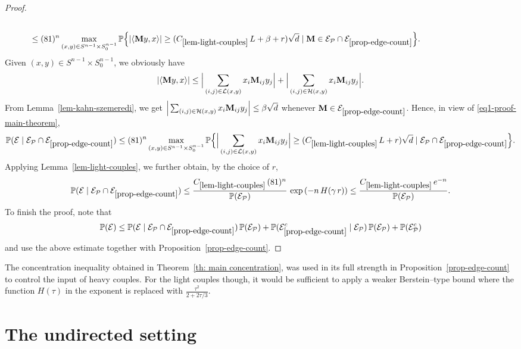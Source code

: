 \documentclass[12pt]{article}
\theoremstyle{definition}
\theoremstyle{plain}
\newcommand{\Event}{\mathcal{E}}
\def\ranmtx{{\bf{}M}}
\def\Prob{{\mathbb P}}
\def\pvector{{\mathcal P}}
\begin{document}
\begin{proof}
\begin{align}
&\nonumber\\
&\hspace{-3cm}\leq (81)^n\max_{(x,y)\in S^{n-1}\times S_0^{n-1}}
\Prob\Big\{ \vert\langle \ranmtx y,x\rangle\vert\geq (C_{\ref{lem-light-couples}}\, L+ \beta+r)\sqrt{d}\mid 
\ranmtx\in\Event_{\pvector}\cap \Event_{\ref{prop-edge-count}}\Big\}.
\end{align}
Given $(x,y)\in S^{n-1}\times S_0^{n-1}$, we obviously have
$$
\vert\langle \ranmtx y,x\rangle\vert 
\leq \Big\vert\sum_{(i,j)\in \mathcal{L}(x,y)} x_i \ranmtx_{ij} y_j\Big\vert +\Big\vert\sum_{(i,j)\in \mathcal{H}(x,y)} x_i \ranmtx_{ij} y_j\Big\vert.
$$
From Lemma~\ref{lem-kahn-szemeredi}, we get $\Big\vert\sum_{(i,j)\in \mathcal{H}(x,y)} x_i \ranmtx_{ij}y_j\Big\vert\leq \beta\sqrt{d}$ 
whenever $\ranmtx\in  \Event_{\ref{prop-edge-count}}$. 
Hence, in view of \eqref{eq1-proof-main-theorem}, 
$$
\Prob(\Event\mid \Event_{\pvector}\cap \Event_{\ref{prop-edge-count}})
\leq (81)^n\max_{(x,y)\in S^{n-1}\times S_0^{n-1}}
\Prob\Big\{  \Big\vert\sum_{(i,j)\in \mathcal{L}(x,y)} x_i \ranmtx_{ij} y_j \Big\vert\geq (C_{\ref{lem-light-couples}}\, L+r)\sqrt{d}\mid 
\Event_{\pvector}\cap \Event_{\ref{prop-edge-count}}\Big\}.
$$
Applying Lemma~\ref{lem-light-couples}, we further obtain, by the choice of $r$,
$$
\Prob(\Event\mid \Event_{\pvector}\cap \Event_{\ref{prop-edge-count}})
\leq \frac{C_{\ref{lem-light-couples}}\, (81)^n}{\Prob(\Event_\pvector)}\,  \exp\left(-n\, H(\gamma\, r)\right)\leq 
 \frac{C_{\ref{lem-light-couples}}\, e^{-n}}{\Prob(\Event_\pvector)}.
$$
To finish the proof, note that 
$$
\Prob(\Event)\leq \Prob(\Event\mid \Event_{\pvector}\cap \Event_{\ref{prop-edge-count}})\, \Prob(\Event_{\pvector})+ 
\Prob( \Event_{\ref{prop-edge-count}}^c\mid \Event_{\pvector})\, \Prob(\Event_{\pvector})+ \Prob(\Event_{\pvector}^c)
$$
and use the above estimate together with Proposition~\ref{prop-edge-count}. 
\end{proof}

The concentration inequality obtained in Theorem~\ref{th: main concentration}, was used in its full strength
in Proposition~\ref{prop-edge-count} to control the input of heavy couples.
For the light couples though, it would be sufficient to apply a weaker Berstein--type
bound where the function $H(\tau)$ in the exponent
is replaced with $\frac{\tau^2}{2+2\tau/3}$.



\section{The undirected setting}\label{s: undirected-case}
\end{document}
